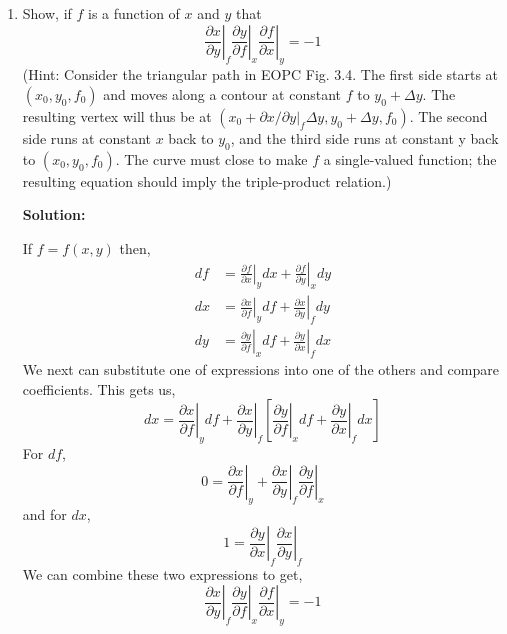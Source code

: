 \documentclass[10pt]{article}
\newenvironment{Solution}
    {\textbf{Solution:}
    
    \vspace{5mm}
    \begin{tcolorbox}
    }
    {
    \end{tcolorbox}
    \vspace{5mm}
    }
\begin{document}
\begin{enumerate}
\begin{enumerate}
    \item \label{3.10b} Show, if $f$ is a function of $x$ and $y$ that 
    \begin{equation}
        \left.\frac{\partial x}{\partial y}\right|_f 
        \left.\frac{\partial y}{\partial f}\right|_x 
        \left.\frac{\partial f}{\partial x}\right|_y = -1
    \end{equation}
    (Hint:  Consider the triangular path in EOPC Fig. 3.4. The first side starts at $(x_0 , y_0 , f_0 )$ and moves along a contour at constant $f$ to $y_0+\Delta y$. The resulting vertex will thus be at $\left(x_0+\left. {\partial x/\partial y}\right|_f \Delta y, y_0+\Delta y, f_0\right)$. The second side runs at constant $x$ back to $y_0$, and the third side runs at constant y back to $(x_0 , y_0 , f_0 )$. The curve must close to make $f$ a single-valued function; the resulting equation should imply the triple-product relation.)
    
    \begin{Solution}
    If $f = f(x,y)$ then,
    \begin{align}
        d f&=\left.\frac{\partial f}{\partial x}\right|_{y} d x+\left.\frac{\partial f}{\partial y}\right|_{x} d y\\
        d x&=\left.\frac{\partial x}{\partial f}\right|_{y} d f+\left.\frac{\partial x}{\partial y}\right|_{f} d y\\
        d y&=\left.\frac{\partial y}{\partial f}\right|_{x} d f+\left.\frac{\partial y}{\partial x}\right|_{f} d x
    \end{align}
    We next can substitute one of expressions into one of the others and compare coefficients. This gets us,
    \begin{equation}
        d x=\left.\frac{\partial x}{\partial f}\right|_{y} d f+\left.\frac{\partial x}{\partial y}\right|_{f}\left[\left.\frac{\partial y}{\partial f}\right|_{x} d f+\left.\frac{\partial y}{\partial x}\right|_{f} d x\right]
    \end{equation}
    For $d f$,
    \begin{equation}
        0 = \left.\frac{\partial x}{\partial f}\right|_{y} + \left.\frac{\partial x}{\partial y}\right|_{f}\left.\frac{\partial y}{\partial f}\right|_{x}
    \end{equation}
    and for $d x$,
    \begin{equation}
        1 = \left.\frac{\partial y}{\partial x}\right|_{f} \left.\frac{\partial x}{\partial y}\right|_{f}
    \end{equation}
    We can combine these two expressions to get,
    \begin{equation}
    \boxed{
        \left.\frac{\partial x}{\partial y}\right|_f \left.\frac{\partial y}{\partial f}\right|_x \left.\frac{\partial f}{\partial x}\right|_y = -1
        }
    \end{equation}
    \end{Solution}
    

\end{enumerate}
\end{enumerate}
\end{document}
